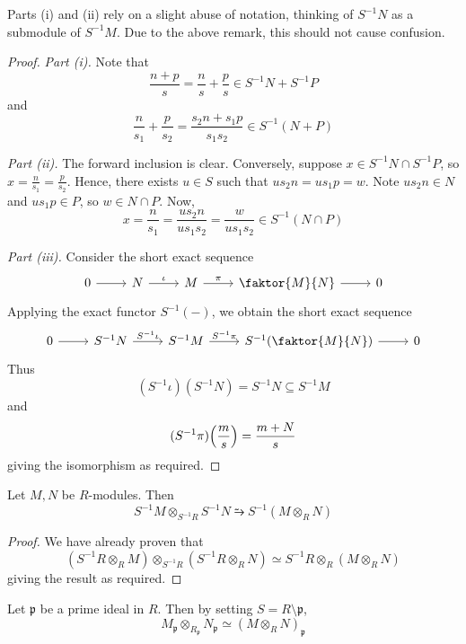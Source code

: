 Parts (i) and (ii) rely on a slight abuse of notation, thinking of \( S^{-1}N \) as a submodule of \( S^{-1}M \).
Due to the above remark, this should not cause confusion.
\begin{proof}
    \emph{Part (i).}
    Note that
    \[ \frac{n+p}{s} = \frac{n}{s} + \frac{p}{s} \in S^{-1}N + S^{-1}P \]
    and
    \[ \frac{n}{s_1} + \frac{p}{s_2} = \frac{s_2 n + s_1 p}{s_1 s_2} \in S^{-1}(N + P) \]

    \emph{Part (ii).}
    The forward inclusion is clear.
    Conversely, suppose \( x \in S^{-1}N \cap S^{-1}P \), so \( x = \frac{n}{s_1} = \frac{p}{s_2} \).
    Hence, there exists \( u \in S \) such that \( u s_2 n = u s_1 p = w \).
    Note \( u s_2 n \in N \) and \( u s_1 p \in P \), so \( w \in N \cap P \).
    Now,
    \[ x = \frac{n}{s_1} = \frac{us_2 n}{u s_1 s_2} = \frac{w}{u s_1 s_2} \in S^{-1}(N \cap P) \]

    \emph{Part (iii).}
    Consider the short exact sequence
\[\begin{tikzcd}
	0 & N & M & {\faktor{M}{N}} & 0
	\arrow[from=1-1, to=1-2]
	\arrow["\iota", from=1-2, to=1-3]
	\arrow["\pi", from=1-3, to=1-4]
	\arrow[from=1-4, to=1-5]
\end{tikzcd}\]
    Applying the exact functor \( S^{-1}(-) \), we obtain the short exact sequence
\[\begin{tikzcd}
	0 & {S^{-1}N} & {S^{-1}M} & {S^{-1}\qty(\faktor{M}{N})} & 0
	\arrow[from=1-1, to=1-2]
	\arrow["{S^{-1}\iota}", from=1-2, to=1-3]
	\arrow["{S^{-1}\pi}", from=1-3, to=1-4]
	\arrow[from=1-4, to=1-5]
\end{tikzcd}\]
    Thus
    \[ (S^{-1}\iota)(S^{-1}N) = S^{-1}N \subseteq S^{-1}M \]
    and
    \[ (S^{-1}\pi)\qty(\frac{m}{s}) = \frac{m+N}{s} \]
    giving the isomorphism as required.
\end{proof}
\begin{proposition}
    Let \( M, N \) be \( R \)-modules.
    Then
    \[ S^{-1}M \otimes_{S^{-1}R} S^{-1}N \similarrightarrow S^{-1}(M \otimes_R N) \]
\end{proposition}
\begin{proof}
    We have already proven that
    \[ (S^{-1}R \otimes_R M) \otimes_{S^{-1}R} (S^{-1}R \otimes_R N) \simeq S^{-1}R \otimes_R (M \otimes_R N) \]
    giving the result as required.
\end{proof}
\begin{example}
    Let \( \mathfrak p \) be a prime ideal in \( R \).
    Then by setting \( S = R \setminus \mathfrak p \),
    \[ M_{\mathfrak p} \otimes_{R_{\mathfrak p}} N_{\mathfrak p} \simeq (M \otimes_R N)_{\mathfrak p} \]
\end{example}

